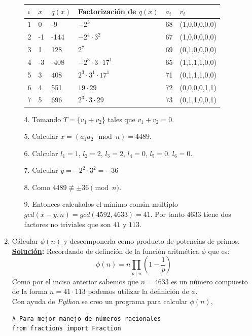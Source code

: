 \documentclass[11pt,letterpaper]{article}
\newcommand{\sol}{\textbf{\underline{Solución}: }} %
\begin{document}
\begin{enumerate}[label=\alph*)]
\begin{itemize}
\begin{table}[h!]
\begin{tabular}{|l|l|l|l|l|l|}
\hline
$i$ & $x$ & $q(x)$ & Factorización de $q(x)$     & $a_i$ & $v_i$         \\ \hline
1   & 0   & -9     & $-2^3$                      & 68    & (1,0,0,0,0,0) \\ \hline
2   & -1  & -144   & $-2^4 \cdot 3^2$            & 67    & (1,0,0,0,0,0) \\ \hline
3   & 1   & 128    & $2^7$                       & 69    & (0,1,0,0,0,0) \\ \hline
4   & -3  & -408   & $-2^3 \cdot 3 \cdot 17^1$   & 65    & (1,1,1,1,0,0) \\ \hline
5   & 3   & 408    & $2^3 \cdot 3^1 \cdot 17^1$  & 71    & (0,1,1,1,0,0) \\ \hline
6   & 4   & 551    & $19 \cdot 29$               & 72    & (0,0,0,0,1,1) \\ \hline
7   & 5   & 696    & $2^3 \cdot 3 \cdot 29$      & 73    & (0,1,1,0,0,1) \\ \hline
\end{tabular}
\end{table}    

\item [4.] Tomando $T= \{v_1 + v_2\}$ tales que $v_1 + v_2= 0$.
\item [5.] Calcular $x = (a_1 a_2 \mod n) = 4489$.
\item [6.] Calcular $l_1=1$, $l_2=2$, $l_3=2$, $l_4=0$, $l_5=0$, $l_6=0$.
\item [7.] Calcular $y = -2^2 \cdot 3^2 = -36$
\item [8.] Como $4489 \not\equiv \pm 36 \pmod{n}$.
\item [9.] Entonces calculados el mínimo común múltiplo $gcd(x-y,n) = gcd(4592, 4633) = 41$.
Por tanto $4633$ tiene dos factores no triviales que son $41$ y $113$.
\end{itemize}


\item Cálcular $\phi(n)$ y descomponerla como producto de potencias de primos.\\
\sol Recordando de definción de la función aritmética $\phi$ que es:
$$\phi(n) = n \prod_{p \mid n} (1 - \frac{1}{p})$$
Como por el inciso anterior sabemos que $n=4633$ es un número compuesto de la forma
$n=41 \cdot 113$ podemos utilizar la definición de $\phi$.\\
Con ayuda de \textit{Python} se creo un programa para calcular $\phi(n)$,
\begin{verbatim}
# Para mejor manejo de números racionales
from fractions import Fraction



\end{verbatim}
\end{enumerate}
\end{document}
